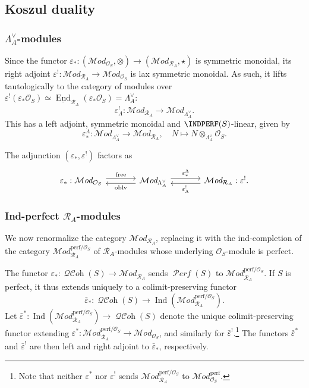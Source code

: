 \documentclass[12pt, oneside]{amsart}
\numberwithin{equation}{section}
\theoremstyle{remark}
\theoremstyle{plain}
\newcommand{\MOD}{\mathcal{M}\textit{od}}
\DeclareMathOperator{\QCOH}{\mathcal{QC}\textit{oh}}
\DeclareMathOperator{\PERF}{\mathcal{P}\textit{erf}}
\newcommand{\hends}{\underline{\operatorname{End}}}
\newcommand{\R}{\mathcal{R}}
\newcommand{\RA}{\R_A}
\newcommand{\lamco}{\Lambda^\vee}
\newcommand{\OO}{\mathcal{O}}
\newcommand{\Ind}{\operatorname{Ind}}
\newcommand{\eps}{\varepsilon}
\newcommand{\epsb}{\bar{\varepsilon}}
\begin{document}
\subsection{Koszul duality}\label{ssec:indperf_RA}

\subsubsection{$\lamco_A$-modules}\label{sssec:eps_lam}

Since the functor $\eps_* : (\MOD_{\OO_S}, \otimes) \to (\MOD_{\RA}, \star)$ is symmetric monoidal, its right adjoint $\eps^! : \MOD_{\RA} \to \MOD_{\OO_S}$ is lax symmetric monoidal.
As such, it lifts tautologically to the category of modules over $\eps^!(\eps_*\OO_S) \simeq \hends_{\RA}(\eps_*\OO_S) = \lamco_A$:
\[
  \eps^!_{\Lambda} : \MOD_{\RA} \to \MOD_{\lamco_A}.
\]
This has a left adjoint, symmetric monoidal and $\INDPERF(S)$-linear, given by
\[
  \eps_*^{\Lambda} : \MOD_{\lamco_A} \to \MOD_{\RA},
  \quad N \mapsto N \otimes_{\lamco_A} \OO_S.
\]

The adjunction $(\eps_*, \eps^!)$ factors as
\[\begin{tikzcd}[column sep=large]
  \eps_*: \MOD_{\OO_S}
  \arrow[r, shift left=3pt, "\mathrm{free}"]
  &
  \MOD_{\lamco_A}
  \arrow[l, shift left=3pt, "\mathrm{oblv}"]
  \arrow[r, shift left=3pt, "\eps_*^{\Lambda}"]
  &
  \MOD_{\RA} : \eps^!.
  \arrow[l, shift left=3pt, "\eps^!_{\Lambda}"]
\end{tikzcd}\]

\subsubsection{Ind-perfect \texorpdfstring{$\RA$}{R\_A}-modules}
\label{sssec:renorm}

We now renormalize the category $\MOD_{\RA}$, replacing it with the ind-completion of the category $\MOD_{\RA}^{\mathrm{perf}/\OO_S}$ of $\RA$-modules whose underlying $\OO_S$-module is perfect.

The functor $\eps_* : \QCOH(S) \to \MOD_{\RA}$ sends $\PERF(S)$ to $\MOD_{\RA}^{\mathrm{perf}/\OO_S}$.
If $S$ is perfect, it thus extends uniquely to a colimit-preserving functor
$$\epsb_* : \QCOH(S) \to \Ind(\MOD_{\RA}^{\mathrm{perf}/\OO_S}).$$
Let $\epsb^* : \Ind(\MOD_{\RA}^{\mathrm{perf}/\OO_S}) \to \QCOH(S)$ denote the unique colimit-preserving functor extending $\eps^* : \MOD_{\RA}^{\mathrm{perf}/\OO_S} \to \MOD_{\OO_S}$, and similarly for $\epsb^!$.\footnote{Note that neither $\eps^*$ nor $\eps^!$ sends $\MOD_{\RA}^{\mathrm{perf}/\OO_S}$ to $\MOD_{\OO_S}^{\mathrm{perf}}$.}
The functors $\epsb^*$ and $\epsb^!$ are then left and right adjoint to $\epsb_*$, respectively.
\end{document}
